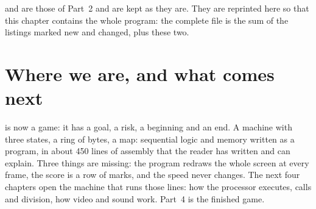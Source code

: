  and  are those of Part~2 and are kept as
they are. They are reprinted here so that this chapter contains the whole
program: the complete file is the sum of the listings marked new and changed,
plus these two.



\section{Where we are, and what comes next}

\vermone is now a game: it has a goal, a risk, a beginning and an end. A
machine with three states, a ring of bytes, a map: sequential logic and memory
written as a program, in about 450 lines of assembly that the reader has
written and can explain. Three things are missing: the program redraws the
whole screen at every frame, the score is a row of marks, and the speed never
changes. The next four chapters open the machine that runs those lines: how
the processor executes, calls and division, how video and sound work. Part~4
is the finished game.
